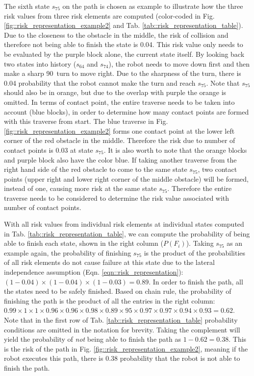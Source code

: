\documentclass[letterpaper]{article} %
\begin{document}
The sixth state $s_{75}$ on the path is chosen as example to illustrate how the three risk values from three risk elements are computed (color-coded in Fig. \ref{fig::risk_representation_example2} and Tab. \ref{tab::risk_representation_table}). Due to the closeness to the obstacle in the middle, the risk of collision and therefore not being able to finish the state is 0.04. This risk value only needs to be evaluated by the purple block alone, the current state itself. By looking back two states into history ($s_{64}$ and $s_{74}$), the robot needs to move down first and then make a sharp 90\degree~turn to move right. Due to the sharpness of the turn, there is 0.04 probability that the robot cannot make the turn and reach $s_{75}$. Note that $s_{75}$ should also be in orange, but due to the overlap with purple the orange is omitted. In terms of contact point, the entire traverse needs to be taken into account (blue blocks), in order to determine how many contact points are formed with this traverse from start. The blue traverse in Fig. \ref{fig::risk_representation_example2} forms one contact point at the lower left corner of the red obstacle in the middle. Therefore the risk due to number of contact points is 0.03 at state $s_{75}$. It is also worth to note that the orange blocks and purple block also have the color blue. If taking another traverse from the right hand side of the red obstacle to come to the same state $s_{75}$, two contact points (upper right and lower right corner of the middle obstacle) will be formed, instead of one, causing more risk at the same state $s_{75}$. Therefore the entire traverse needs to be considered to determine the risk value associated with number of contact points. 

With all risk values from individual risk elements at individual states computed in Tab. \ref{tab::risk_representation_table}, we can compute the probability of being able to finish each state, shown in the right column ($P(F_i)$). Taking $s_{75}$ as an example again, the probability of finishing $s_{75}$ is the product of the probabilities of all risk elements do not cause failure at this state due to the lateral independence assumption (Eqn. \ref{eqn::risk_representation}): $(1-0.04)\times(1-0.04)\times(1-0.03)=0.89$. In order to finish the path, all the states need to be safely finished. Based on chain rule, the probability of finishing the path is the product of all the entries in the right column: $0.99\times1\times1\times0.96\times0.96\times0.98\times0.89\times95\times0.97\times0.97\times0.94\times0.93=0.62$. Note that in the first row of Tab. \ref{tab::risk_representation_table} probability conditions are omitted in the notation for brevity. Taking the complement will yield the probability of \emph{not} being able to finish the path as $1-0.62=0.38$. This is the risk of the path in Fig. \ref{fig::risk_representation_example2}, meaning if the robot executes this path, there is 0.38 probability that the robot is not able to finish the path. 
\end{document}
